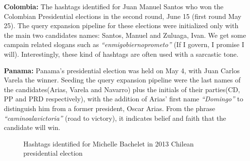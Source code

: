 \noindent
{\bf Colombia:}
The hashtags identified for Juan Manuel Santos who won the Colombian Presidential elections in the second round,
June 15 (first round May 25). The query expansion pipeline for these elections were initialized only with the main two candidates names: Santos, Manuel and Zuluaga, Ivan. We get some campain related slogans such as \emph{``enmigobiernoprometo''} (If I govern, I promise I will). Interestingly, these kind of hashtags are often used with a sarcastic tone.

\noindent
{\bf Panama:}
Panama's presidential election was held on May 4, with Juan Carlos Varela the winner. Seeding the query expansion pipeline were the last names of the candidates(Arias, Varela and Navarro) plus the initials of their parties(CD, PP and PRD respectively), with the addition of Arias' first name \emph{``Domingo''} to distinguish him from a former president, Oscar Arias. From the phrase \emph{``caminoalavictoria''} (road to victory), it indicates belief and faith that the candidate will win.

\begin{figure}
	\centering
	\caption{Hashtags identified for Michelle Bachelet in 2013 Chilean presidential election} 
	\label{fig:bacheletwordCloud}
\end{figure}

